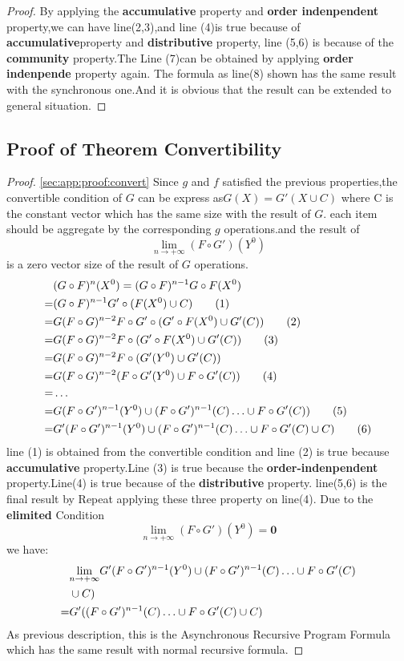 \begin{appendix}
\begin{proof}
By applying the \textbf{accumulative} property and \textbf{order indenpendent} property,we can have line(2,3),and line (4)is true because of \textbf{accumulative}property
and \textbf{distributive} property, line (5,6) is because of the \textbf{community} property.The Line (7)can be obtained by applying \textbf{order indenpende} property again.
The formula as line(8) shown has the same result with the synchronous one.And it is obvious that the result can be extended to general situation.
 \end{proof}
 \subsection{Proof of Theorem Convertibility}
 \begin{proof}
 	\ref{sec:app:proof:convert}
 	Since $g$ and $f$ satisfied the previous properties,the convertible condition of $G$ can be express as$G(X)=G'(X \cup C)$ where C is the constant vector which has the same size with the result of $G$. each item should be aggregate by the corresponding $g$ operations.and the result of $${\lim_{n \to +\infty}(F \circ G')(Y^0)}$$ is a zero vector size of the result of $G$ operations.
 \begin{align}
&(G \circ F)^n(X^0)=(G \circ F)^{n-1}G \circ F(X^{0})\notag\\
=&(G \circ F)^{n-1}G'\circ (F(X^{0}) \cup C)\tag{1}\\
=&G(F \circ G)^{n-2}F \circ G'\circ (G'\circ F(X^{0}) \cup G'(C))\tag{2}\\
=&G(F \circ G)^{n-2}F \circ (G'\circ F(X^{0}) \cup G'(C))\tag{3}\\
=&G(F \circ G)^{n-2}F \circ (G'(Y^{0}) \cup G'(C))\notag\\
=&G(F \circ G)^{n-2}(F \circ G'(Y^{0}) \cup F\circ G'(C))\tag{4}\\
=&\ldots \notag\\
=&G(F \circ G')^{n-1}(Y^0)\cup(F \circ G')^{n-1}(C)\ldots \cup F\circ G'(C))\tag{5} \\
=&G'(F \circ G')^{n-1}(Y^0)\cup(F \circ G')^{n-1}(C)\ldots \cup F\circ G'(C) \cup  C)\tag{6}
 \end{align}
line (1) is obtained from the convertible condition and  line (2) is true because \textbf{accumulative} property.Line (3) is true because the \textbf{order-indenpendent} property.Line(4) is true because of the \textbf{distributive} property.
line(5,6) is the final result by Repeat applying these three property on line(4).
Due to the \textbf{elimited} Condition $${\lim_{n \to +\infty}(F \circ G')(Y^0)=\textbf{0}}$$
we have:
\begin{align}
&{\lim_{n\to +\infty}}G'(F \circ G')^{n-1}(Y^0)\cup(F \circ G')^{n-1}(C)\ldots \cup F\circ G'(C) \notag\\
&\cup C)\notag\\
=&G'((F \circ G')^{n-1}(C)\ldots \cup F\circ G'(C)\cup C)\notag
\end{align}
As previous description, this is the Asynchronous Recursive Program Formula which has the same result with normal recursive formula.


\end{proof}
\end{appendix}
